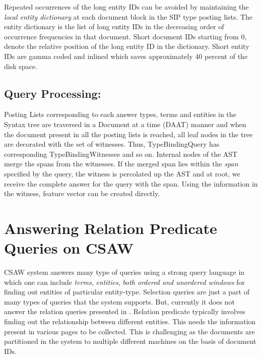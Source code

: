 \documentclass[11pt]{report}
\begin{document}
Repeated occurrences of the long entity IDs can be avoided by maintaining the \textit{local entity dictionary} at each document block in the 
SIP type posting lists. The entity dictionary is the list of long entity IDs in the decreasing order of occurrence frequencies in that document. Short document IDs
starting from 0, denote the relative position of the long entity ID in the dictionary. Short entity IDs are gamma coded and inlined which saves approximately
40 percent of the disk space.

\section{Query Processing:}
Posting Lists corresponding to each answer types, terms and entities in the Syntax tree are traversed in a Document at a time (DAAT) manner and when the document present
in all the posting lists is reached, all leaf nodes in the tree are decorated with the set of witnesses. Thus, TypeBindingQuery has corresponding
TypeBindingWitnesses and so on. Internal nodes of the AST merge the spans from the witnesses. If the merged span lies within the \textit{span} specified by the query, the 
witness is percolated up the AST and at root, we receive the complete answer for the query with the span. Using the information in the witness, feature
vector can be created directly.
\chapter{Answering Relation Predicate Queries on CSAW}
CSAW system \cite{csaw} answers many type of queries using a strong query language in which one can include \textit{terms}, \textit{entities}, 
\textit{both ordered and unordered windows} for finding out entities of particular entity-type. Selection queries are just a part of many types of
queries that the system supports.
But, currently it does not answer the relation queries presented in \cite{ssq}.
Relation predicate typically involves finding out the relationship between different entities. This needs the information present
in various pages to be collected. This is challenging as the documents are partitioned in the system \cite{csaw} to multiple different machines on the basis of 
document IDs.
\end{document}
